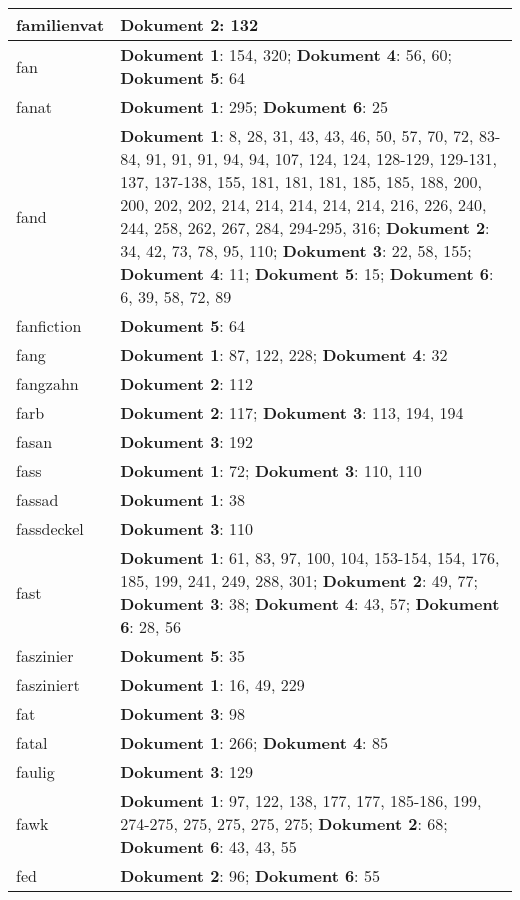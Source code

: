 \documentclass[a5paper]{article}
\begin{document}
\begin{longtable}[l]{|l|p{3in}|}
\hline
familienvat & \textbf{Dokument 2}: 132 \\
\hline
fan & \textbf{Dokument 1}: 154, 320; \textbf{Dokument 4}: 56, 60; \textbf{Dokument 5}: 64 \\
\hline
fanat & \textbf{Dokument 1}: 295; \textbf{Dokument 6}: 25 \\
\hline
fand & \textbf{Dokument 1}: 8, 28, 31, 43, 43, 46, 50, 57, 70, 72, 83-84, 91, 91, 91, 94, 94, 107, 124, 124, 128-129, 129-131, 137, 137-138, 155, 181, 181, 181, 185, 185, 188, 200, 200, 202, 202, 214, 214, 214, 214, 214, 216, 226, 240, 244, 258, 262, 267, 284, 294-295, 316; \textbf{Dokument 2}: 34, 42, 73, 78, 95, 110; \textbf{Dokument 3}: 22, 58, 155; \textbf{Dokument 4}: 11; \textbf{Dokument 5}: 15; \textbf{Dokument 6}: 6, 39, 58, 72, 89 \\
\hline
fanfiction & \textbf{Dokument 5}: 64 \\
\hline
fang & \textbf{Dokument 1}: 87, 122, 228; \textbf{Dokument 4}: 32 \\
\hline
fangzahn & \textbf{Dokument 2}: 112 \\
\hline
farb & \textbf{Dokument 2}: 117; \textbf{Dokument 3}: 113, 194, 194 \\
\hline
fasan & \textbf{Dokument 3}: 192 \\
\hline
fass & \textbf{Dokument 1}: 72; \textbf{Dokument 3}: 110, 110 \\
\hline
fassad & \textbf{Dokument 1}: 38 \\
\hline
fassdeckel & \textbf{Dokument 3}: 110 \\
\hline
fast & \textbf{Dokument 1}: 61, 83, 97, 100, 104, 153-154, 154, 176, 185, 199, 241, 249, 288, 301; \textbf{Dokument 2}: 49, 77; \textbf{Dokument 3}: 38; \textbf{Dokument 4}: 43, 57; \textbf{Dokument 6}: 28, 56 \\
\hline
faszinier & \textbf{Dokument 5}: 35 \\
\hline
fasziniert & \textbf{Dokument 1}: 16, 49, 229 \\
\hline
fat & \textbf{Dokument 3}: 98 \\
\hline
fatal & \textbf{Dokument 1}: 266; \textbf{Dokument 4}: 85 \\
\hline
faulig & \textbf{Dokument 3}: 129 \\
\hline
fawk & \textbf{Dokument 1}: 97, 122, 138, 177, 177, 185-186, 199, 274-275, 275, 275, 275, 275; \textbf{Dokument 2}: 68; \textbf{Dokument 6}: 43, 43, 55 \\
\hline
fed & \textbf{Dokument 2}: 96; \textbf{Dokument 6}: 55 \\

\end{longtable}
\end{document}
